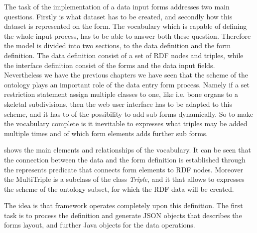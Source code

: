 The task of the implementation of a data input forms addresses two main questions. Firstly is what dataset has to be created, and secondly how this dataset is represented on the form. The vocabulary which is capable
of defining the whole input process, has to be able to answer both these question. Therefore the model is divided into two sections, to the data definition and the form definition. The data definition consist of a set of RDF nodes and triples, while the interface definition consist of the forms and the data input fields. Nevertheless we have the previous chapters we have seen that the scheme of the ontology plays an important role of the data entry form process. Namely if a set restriction statement assign multiple classes to one, like i.e. bone organs to a skeletal subdivisions, then the web user interface has to
be adapted to this scheme, and it has to of the possibility to add sub forms dynamically. So to make the vocabulary complete is it inevitable to expresses
what triples may be added multiple times and of which form elements adds further sub forms.


 shows the main elements and relationships of the vocabulary. It can be seen that the connection between the data and the form definition is established through the represents predicate that connects form elements to RDF nodes. Moreover the MultiTriple is a subclass of the class \textit{Triple}, and it that allows to expresses the scheme of the ontology subset, for which the RDF data will be created.

The idea is that framework operates completely upon this definition. The first task is to process the definition and generate JSON objects that describes the forms layout, and further Java objects for the data operations.


